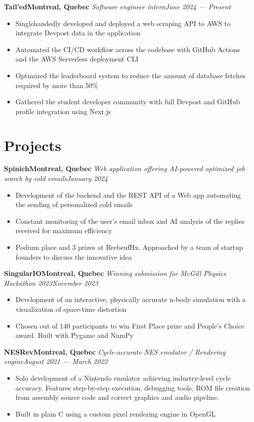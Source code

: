 \documentclass{article}
\newcommand{\newrole}[4]{
    {\normalfont\bfseries #1\hfill#3}
    \newline
    \textit{#2}\hfill\textit{#4}
}
\newenvironment{bulletpoints}{\begin{itemize}\setlength\itemsep{-0.3em}}{\end{itemize}}
\begin{document}
\newrole{Tail'ed}{Software engineer intern}{Montreal, Quebec}{June 2024 --- Present}
\begin{bulletpoints}
    \item Singlehandedly developed and deployed a web scraping API to AWS to integrate Devpost data in the application
    \item Automated the CI/CD workflow across the codebase with GitHub Actions and the AWS Serverless deployment CLI
    \item Optimized the leaderboard system to reduce the amount of database fetches required by more than 50\%
    \item Gathered the student developer community with full Devpost and GitHub profile integration using Next.js
\end{bulletpoints}


\section*{Projects}

\newrole{Spinich}{Web application offering AI-powered optimized job search by cold emails}{Montreal, Quebec}{January 2024}
\begin{bulletpoints}
    \item Development of the backend and the REST API of a Web app automating the sending of personalized cold emails
    \item Constant monitoring of the user's email inbox and AI analysis of the replies received for maximum efficiency
    \item Podium place and 3 prizes at BrebeufHx. Approached by a team of startup founders to discuss the innovative idea 
\end{bulletpoints}

\newrole{SingularIO}{Winning submission for McGill Physics Hackathon 2023}{Montreal, Quebec}{November 2023}
\begin{bulletpoints}
    \item Development of an interactive, physically accurate n-body simulation with a visualization of space-time distortion
    \item Chosen out of 140 participants to win First Place prize and People’s Choice award. Built with Pygame and NumPy
\end{bulletpoints}

\newrole{NESRev}{Cycle-accurate NES emulator / Rendering engine}{Montreal, Quebec}{August 2021 --- March 2022}
\begin{bulletpoints}
    \item Solo development of a Nintendo emulator achieving industry-level cycle accuracy. Features step-by-step execution, debugging tools, ROM file creation from assembly source code and correct graphics and audio pipeline.
    \item Built in plain C using a custom pixel rendering engine in OpenGL
\end{bulletpoints}
\end{document}
